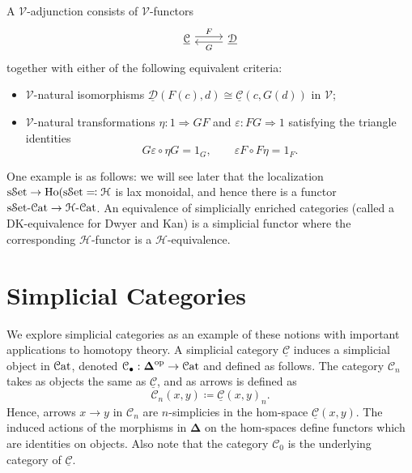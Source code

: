 \begin{definition}\label{dfn:3.8}
	A $\mathcal{V} $-adjunction consists of $\mathcal{V} $-functors
	\[\begin{tikzcd}[row sep = 2.5em, column sep = 2.5em]
	\underline{\mathcal{C} } \ar[" F ", shift left, r]  & \underline{\mathcal{D} } \ar[" G ", shift left, l] 
	\end{tikzcd}\]
	together with either of the following equivalent criteria:
	\begin{itemize}
		\item $\mathcal{V} $-natural isomorphisms $\underline{\mathcal{D} } (F(c),d)\cong \underline{\mathcal{C} } (c,G(d))$ in $\mathcal{V} $;
		\item $\mathcal{V} $-natural transformations $\eta : 1 \Rightarrow GF$ and $\varepsilon : FG \Rightarrow 1$ satisfying the triangle identities
			\[
				G\varepsilon \circ \eta G=1_G,\qquad \varepsilon F\circ F\eta = 1_F
			.\]
	\end{itemize}
\end{definition}

One example is as follows: we will see later that the localization $\mathrm{s}\mathcal{S}\mathrm{et}\to \operatorname{Ho}(\mathrm{s}\mathcal{S}\mathrm{et}\eqqcolon \mathcal{H} $ is lax monoidal, and hence there is a functor $\mathrm{s}\mathcal{S}\mathrm{et}\text{-} \mathcal{C}\mathrm{at} \to \mathcal{H} \text{-} \mathcal{C}\mathrm{at} $. An equivalence of simplicially enriched categories (called a DK-equivalence for Dwyer and Kan) is a simplicial functor where the corresponding $\mathcal{H} $-functor is a $\mathcal{H} $-equivalence.

\section{Simplicial Categories}

We explore simplicial categories as an example of these notions with important applications to homotopy theory. A simplicial category $\underline{\mathcal{C} } $ induces a simplicial object in $\mathcal{C}\mathrm{at} $, denoted $\mathcal{C} _{\bullet} : \boldsymbol{\Delta} ^{\mathrm{op}}  \to \mathcal{C}\mathrm{at} $ and defined as follows. The category $\mathcal{C} _n$ takes as objects the same as $\underline{\mathcal{C} } $, and as arrows is defined as
\[
	\mathcal{C} _n(x,y)\coloneqq \underline{\mathcal{C} } (x,y)_n
.\]
Hence, arrows $x\to y$ in $\mathcal{C} _n$ are $n$-simplicies in the hom-space $\underline{\mathcal{C} } (x,y)$. The induced actions of the morphisms in $\boldsymbol{\Delta} $ on the hom-spaces define functors which are identities on objects. Also note that the category $\mathcal{C} _0$ is the underlying category of $\underline{\mathcal{C} } $.


